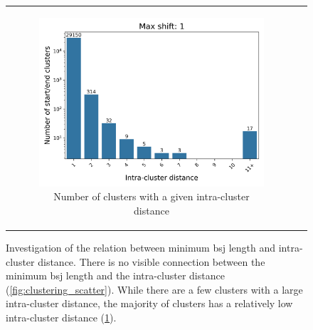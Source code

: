 \begin{figure}[ht]
\begin{tabular}{cc}
\begin{subfigure}{0.5\textwidth}
                       \includegraphics[width=\linewidth]{chapters/4_results_and_discussion/figures/detection/distances/diff_1_bar.png}
                       \caption{Number of clusters with a given intra-cluster
                           distance}
                       \label{fig:clustering_bar} \end{subfigure}\end{tabular}
    \caption{Investigation of the relation between minimum \gls{bsj} length and
        intra-cluster distance.
        There is no visible connection between the minimum \gls{bsj} length and the
        intra-cluster distance (\cref{fig:clustering_scatter}).
        While there are a few clusters with a large intra-cluster distance, the
        majority of clusters has a relatively low intra-cluster distance
        (\cref{fig:clustering_bar}).
    }
    \label{fig:clustering}
\end{figure}


